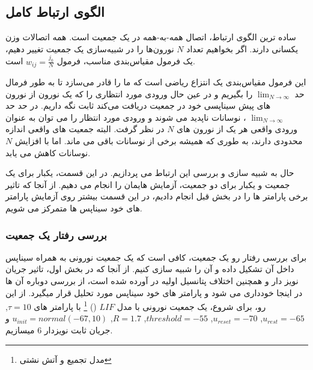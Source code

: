 \documentclass{report}
\begin{document}
    \subsection{الگوی ارتباط کامل}
        ساده ترین الگوی ارتباط، اتصال همه-به-همه در یک جمعیت است. همه اتصالات وزن یکسانی دارند. اگر بخواهیم تعداد 
        $N$
        نورون‌ها را در شبیه‌سازی یک جمعیت تغییر دهیم، یک فرمول مقیاس‌بندی مناسب، فرمول 
        $w_{ij} = \frac{j_0}{N}$
        است.

        این فرمول مقیاس‌بندی یک انتزاع ریاضی است که ما را قادر می‌سازد تا به طور فرمال حد 
        $\lim_{N\rightarrow \infty}$
        را بگیریم و در عین حال ورودی مورد انتظاری را که یک نورون از نورون های پیش سیناپسی خود در جمعیت دریافت می‌کند ثابت نگه داریم. در حد حد 
        $\lim_{N\rightarrow \infty}$
        ، نوسانات ناپدید می شوند و ورودی مورد انتظار را می توان به عنوان ورودی واقعی هر یک از نورون های 
        $N$ 
        در نظر گرفت. البته جمعیت های واقعی اندازه محدودی دارند، به طوری که همیشه برخی از نوسانات باقی می ماند. اما با افزایش 
        $N$
        نوسانات کاهش می یابد. \cite{Neuronal-Dynamics}
        
        حال به شبیه سازی و بررسی این ارتباط می پردازیم. در این قسمت، یکبار برای یک جمعیت و یکبار برای دو جمعیت، آزمایش هایمان را انجام می دهیم. از آنجا که تاثیر برخی پارامتر ها را در بخش قبل انجام دادیم، در این قسمت بیشتر روی آزمایش پارامتر های خود سیناپس ها متمرکز می شویم.
        \subsubsection*{بررسی رفتار یک جمعیت}
            برای بررسی رفتار رو یک جمعیت، کافی است که یک جمعیت نورونی به همراه سیناپس داخل آن تشکیل داده و آن را شبیه سازی کنیم. از آنجا که در بخش اول، تاثیر جریان نویز دار و همچنین اختلاف پتانسیل اولیه در آورده شده است، از بررسی دوباره آن ها در اینجا خودداری می شود و پارامتر های خود سیناپس مورد تحلیل قرار میگیرد. از این رو، 
            برای شروع، یک جمعیت نورونی با مدل 
            $LIF$
            ()
            \footnote{مدل تجمیع و آتش نشتی}
            با پارامتر های 
            $\tau=10$,
            $u_{rest}=-65$,
            $u_{reset}=-70$,
            $threshold=-55$,
            $R=1.7$,
            $u_{init}=normal(-67,10)$
            و جریان ثابت نویزدار
            $6$ 
            میسازیم. 
\end{document}
